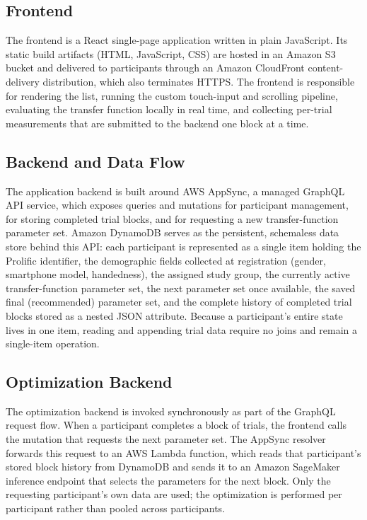 \documentclass[12pt,a4paper]{report}
\begin{document}
        \subsection{Frontend}

        The frontend is a React single-page application written in plain JavaScript. Its static build artifacts (HTML, JavaScript, CSS) are hosted in an Amazon S3 bucket and delivered to participants through an Amazon CloudFront content-delivery distribution, which also terminates HTTPS. The frontend is responsible for rendering the list, running the custom touch-input and scrolling pipeline, evaluating the transfer function locally in real time, and collecting per-trial measurements that are submitted to the backend one block at a time.

        \subsection{Backend and Data Flow}

        The application backend is built around AWS AppSync, a managed GraphQL API service, which exposes queries and mutations for participant management, for storing completed trial blocks, and for requesting a new transfer-function parameter set. Amazon DynamoDB serves as the persistent, schemaless data store behind this API: each participant is represented as a single item holding the Prolific identifier, the demographic fields collected at registration (gender, smartphone model, handedness), the assigned study group, the currently active transfer-function parameter set, the next parameter set once available, the saved final (recommended) parameter set, and the complete history of completed trial blocks stored as a nested JSON attribute. Because a participant's entire state lives in one item, reading and appending trial data require no joins and remain a single-item operation.

        \subsection{Optimization Backend}

        The optimization backend is invoked synchronously as part of the GraphQL request flow. When a participant completes a block of trials, the frontend calls the mutation that requests the next parameter set. The AppSync resolver forwards this request to an AWS Lambda function, which reads that participant's stored block history from DynamoDB and sends it to an Amazon SageMaker inference endpoint that selects the parameters for the next block. Only the requesting participant's own data are used; the optimization is performed per participant rather than pooled across participants.
\end{document}
